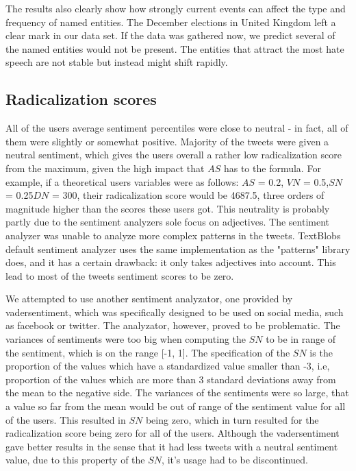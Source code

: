 \documentclass[conference]{IEEEtran}
\begin{document}
The results also clearly show how strongly current events can affect the type and 
frequency of named entities. The December elections in United Kingdom left a clear mark in our 
data set. If the data was gathered now, we predict several of the named entities would not be 
present. The entities that attract the most hate speech are not stable but instead might shift rapidly.

\subsection{Radicalization scores}
All of the users average sentiment percentiles were close to neutral - in fact,
all of them were slightly or somewhat positive. 
Majority of the tweets were given a neutral sentiment, which gives the users overall
a rather low radicalization score from the maximum, given the high impact that \(AS\)
has to the formula. For example, if a theoretical users variables were as follows: \(AS\) = 0.2,
\(VN\) = 0.5,\(SN\) = 0.25\(DN\) = 300, their radicalization score would be 4687.5, three orders
of magnitude higher than the scores these users got. This neutrality 
is probably partly due to the sentiment analyzers sole focus on adjectives. The sentiment analyzer
was unable to analyze more complex patterns in the tweets.
TextBlobs default sentiment analyzer uses the same implementation as the "patterns" library does,
and it has a certain drawback: it only takes adjectives into account. This lead to most of the 
tweets sentiment scores to be zero. 

We attempted to use another sentiment
analyzator, one provided by vadersentiment,
which was specifically designed to be used on social media, such as facebook or twitter. 
The analyzator, however, proved to be problematic. 
The variances of sentiments were too big when computing the \(SN\) to be in range of the sentiment, 
which is on the range [-1, 1]. The specification of the \(SN\) is the proportion of the values which 
have a standardized value smaller than -3, i.e, proportion of the values which are more than 3 standard 
deviations away from the mean to the negative side. The variances of the sentiments were so large, that 
a value so far from the mean would be out of range of the sentiment value for all of the users. This resulted 
in \(SN\) being zero, which in turn resulted for the radicalization score being zero for all of the users. 
Although the vadersentiment gave better results in the sense that it had less tweets with a neutral sentiment 
value, due to this property of the \(SN\), it's usage had to be discontinued. \\
\end{document}
